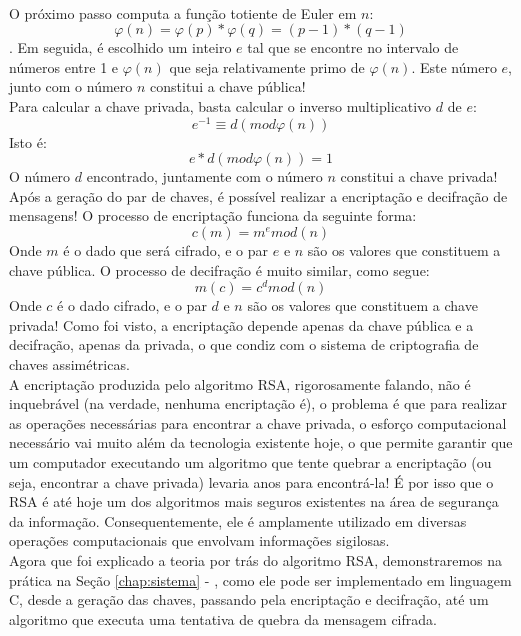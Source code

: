 	\\ \indent O próximo passo computa a função totiente de Euler em $n$:
	\begin{equation}
		\varphi(n) = \varphi(p) * \varphi(q) = \left(p - 1\right)*\left(q - 1\right)
		\label{eq:phiden}
	\end{equation}.
	\indent Em seguida, é escolhido um inteiro $e$ tal que se encontre no intervalo de números entre 1 e $\varphi(n)$ que seja relativamente primo de $\varphi(n)$. Este número $e$, junto com o número $n$ constitui a chave pública!
	\\ \indent Para calcular a chave privada, basta calcular o inverso multiplicativo $d$ de $e$:
	\begin{equation}
		e^{-1} \equiv d (mod \varphi(n))
		\label{eq:d}
	\end{equation}
	\indent Isto é:
	\begin{equation}
		e * d (mod \varphi(n)) = 1
		\label{eq:dsimples}
	\end{equation}
	\indent O número $d$ encontrado, juntamente com o número $n$ constitui a chave privada!
	\\ \indent Após a geração do par de chaves, é possível realizar a encriptação e decifração de mensagens! O processo de encriptação funciona da seguinte forma:
	\begin{equation}
		c(m) = m^{e} mod(n)
		\label{eq:cifrar}
	\end{equation}
	\indent Onde $m$ é o dado que será cifrado, e o par $e$ e $n$ são os valores que constituem a chave pública. O processo de decifração é muito similar, como segue:
	\begin{equation}
		m(c) = c^{d} mod(n)
		\label{eq:decifrar}
	\end{equation}
	\indent Onde $c$ é o dado cifrado, e o par $d$ e $n$ são os valores que constituem a chave privada! Como foi visto, a encriptação depende apenas da chave pública e a decifração, apenas da privada, o que condiz com o sistema de criptografia de chaves assimétricas.
	\\ \indent A encriptação produzida pelo algoritmo RSA, rigorosamente falando, não é inquebrável (na verdade, nenhuma encriptação é), o problema é que para realizar as operações necessárias para encontrar a chave privada, o esforço computacional necessário vai muito além da tecnologia existente hoje, o que permite garantir que um computador executando um algoritmo que tente quebrar a encriptação (ou seja, encontrar a chave privada) levaria anos para encontrá-la! É por isso que o RSA é até hoje um dos algoritmos mais seguros existentes na área de segurança da informação. Consequentemente, ele é amplamente utilizado em diversas operações computacionais que envolvam informações sigilosas.
	\\ \indent Agora que foi explicado a teoria por trás do algoritmo RSA, demonstraremos na prática na Seção \ref{chap:sistema} - , como ele pode ser implementado em linguagem C, desde a geração das chaves, passando pela encriptação e decifração, até um algoritmo que executa uma tentativa de quebra da mensagem cifrada.
